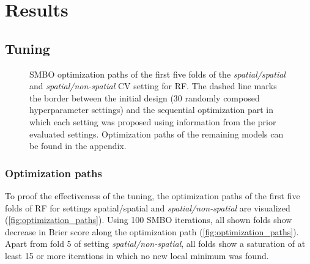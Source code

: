\documentclass[review]{elsarticle}
\begin{document}
\section{Results}

\subsection{Tuning}

\begin{figure} [t!]
	\begin{center}
		\caption[]{SMBO optimization paths of the first five folds of the \emph{spatial/spatial} and \emph{spatial/non-spatial} CV setting for \ac{RF}. The dashed line marks the border between the initial design (30 randomly composed hyperparameter settings) and the sequential optimization part in which each setting was proposed using information from the prior evaluated settings. Optimization paths of the remaining models can be found in the appendix.}
		\label{fig:optimization_paths}
	\end{center}
\end{figure}

\subsubsection{Optimization paths}
To proof the effectiveness of the tuning, the optimization paths of the first five folds of RF for settings {spatial/spatial} and \emph{spatial/non-spatial} are visualized (\autoref{fig:optimization_paths}).
Using 100 SMBO iterations, all shown folds show decrease in Brier score along the optimization path (\autoref{fig:optimization_paths}).
Apart from fold 5 of setting \emph{spatial/non-spatial}, all folds show a saturation of at least 15 or more iterations in which no new local minimum was found.
\end{document}
